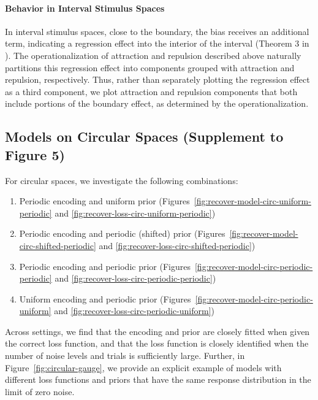 \documentclass[si.tex]{subfiles}
\begin{document}
\paragraph*{Behavior in Interval Stimulus Spaces}
In interval stimulus spaces, close to the boundary, the bias receives an additional term, indicating a regression effect into the interior of the interval (Theorem 3 in \cite{hahn2024unifying}).
The operationalization of attraction and repulsion described above naturally partitions this regression effect into components grouped with attraction and repulsion, respectively. Thus, rather than separately plotting the regression effect as a third component, we plot attraction and repulsion components that both include portions of the boundary effect, as determined by the operationalization.




\subsection{Models on Circular Spaces (Supplement to Figure 5)}
For circular spaces, we investigate the following combinations:
\begin{enumerate}
\item Periodic encoding and uniform prior (Figures~\ref{fig:recover-model-circ-uniform-periodic} and \ref{fig:recover-loss-circ-uniform-periodic})
\item Periodic encoding and periodic (shifted) prior (Figures~\ref{fig:recover-model-circ-shifted-periodic} and  \ref{fig:recover-loss-circ-shifted-periodic})
\item Periodic encoding and periodic prior (Figures~\ref{fig:recover-model-circ-periodic-periodic} and  \ref{fig:recover-loss-circ-periodic-periodic})
\item Uniform encoding and periodic prior (Figures~\ref{fig:recover-model-circ-periodic-uniform} and  \ref{fig:recover-loss-circ-periodic-uniform})
\end{enumerate}
Across settings, we find that the encoding and prior are closely fitted when given the correct loss function, and that the loss function is closely identified when the number of noise levels and trials is sufficiently large.
Further, in Figure~\ref{fig:circular-gauge}, we provide an explicit example of models with different loss functions and priors that have the same response distribution in the limit of zero noise.
\end{document}
